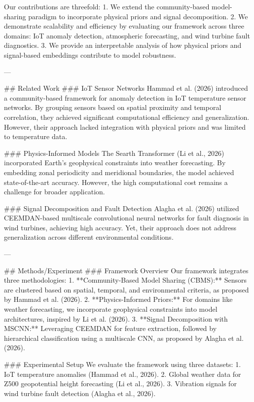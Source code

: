 Our contributions are threefold:  
1. We extend the community-based model-sharing paradigm to incorporate physical priors and signal decomposition.  
2. We demonstrate scalability and efficiency by evaluating our framework across three domains: IoT anomaly detection, atmospheric forecasting, and wind turbine fault diagnostics.  
3. We provide an interpretable analysis of how physical priors and signal-based embeddings contribute to model robustness.  

---

## Related Work  
### IoT Sensor Networks  
Hammad et al. (2026) introduced a community-based framework for anomaly detection in IoT temperature sensor networks. By grouping sensors based on spatial proximity and temporal correlation, they achieved significant computational efficiency and generalization. However, their approach lacked integration with physical priors and was limited to temperature data.  

### Physics-Informed Models  
The Searth Transformer (Li et al., 2026) incorporated Earth's geophysical constraints into weather forecasting. By embedding zonal periodicity and meridional boundaries, the model achieved state-of-the-art accuracy. However, the high computational cost remains a challenge for broader application.  

### Signal Decomposition and Fault Detection  
Alagha et al. (2026) utilized CEEMDAN-based multiscale convolutional neural networks for fault diagnosis in wind turbines, achieving high accuracy. Yet, their approach does not address generalization across different environmental conditions.  

---

## Methods/Experiment  
### Framework Overview  
Our framework integrates three methodologies:  
1. **Community-Based Model Sharing (CBMS):** Sensors are clustered based on spatial, temporal, and environmental criteria, as proposed by Hammad et al. (2026).  
2. **Physics-Informed Priors:** For domains like weather forecasting, we incorporate geophysical constraints into model architectures, inspired by Li et al. (2026).  
3. **Signal Decomposition with MSCNN:** Leveraging CEEMDAN for feature extraction, followed by hierarchical classification using a multiscale CNN, as proposed by Alagha et al. (2026).  

### Experimental Setup  
We evaluate the framework using three datasets:  
1. IoT temperature anomalies (Hammad et al., 2026).  
2. Global weather data for Z500 geopotential height forecasting (Li et al., 2026).  
3. Vibration signals for wind turbine fault detection (Alagha et al., 2026).  

